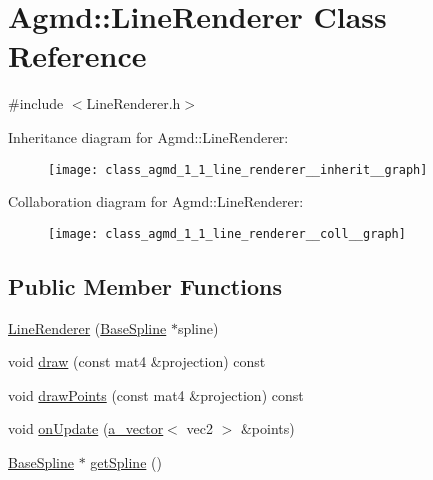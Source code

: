 \hypertarget{class_agmd_1_1_line_renderer}{\section{Agmd\+:\+:Line\+Renderer Class Reference}
\label{class_agmd_1_1_line_renderer}
}


{\ttfamily \#include $<$Line\+Renderer.\+h$>$}



Inheritance diagram for Agmd\+:\+:Line\+Renderer\+:\nopagebreak
\begin{figure}[H]
\begin{center}
\leavevmode
\texttt{[image: class\_agmd\_1\_1\_line\_renderer\_\_inherit\_\_graph]}
\end{center}
\end{figure}


Collaboration diagram for Agmd\+:\+:Line\+Renderer\+:\nopagebreak
\begin{figure}[H]
\begin{center}
\leavevmode
\texttt{[image: class\_agmd\_1\_1\_line\_renderer\_\_coll\_\_graph]}
\end{center}
\end{figure}
\subsection*{Public Member Functions}
\begin{DoxyCompactItemize}
\item 
\hyperlink{class_agmd_1_1_line_renderer_a9e325ddbe279157e0082388130d4ec06}{Line\+Renderer} (\hyperlink{class_agmd_1_1_base_spline}{Base\+Spline} $\ast$spline)
\item 
void \hyperlink{class_agmd_1_1_line_renderer_a67aa8ac3de03953518f33c3fbf5810bb}{draw} (const mat4 \&projection) const 
\item 
void \hyperlink{class_agmd_1_1_line_renderer_a855e64fea45bccb9d46735dcd60d82ac}{draw\+Points} (const mat4 \&projection) const 
\item 
void \hyperlink{class_agmd_1_1_line_renderer_a15870f58e43918b31fc3be61b6b3e825}{on\+Update} (\hyperlink{_vector_8h_a3df82cea60ff4ad0acb44e58454406a5}{a\+\_\+vector}$<$ vec2 $>$ \&points)
\item 
\hyperlink{class_agmd_1_1_base_spline}{Base\+Spline} $\ast$ \hyperlink{class_agmd_1_1_line_renderer_ab166be92af2ba3f66557df84acbc766c}{get\+Spline} ()
\end{DoxyCompactItemize}



